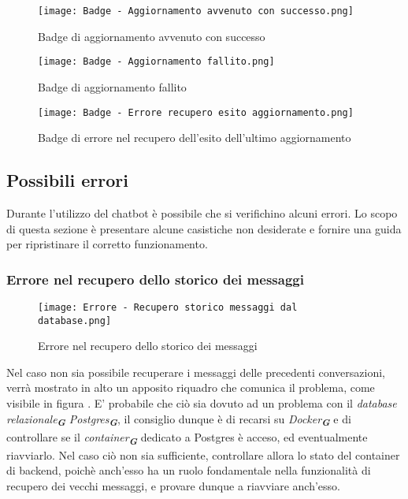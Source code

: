 \newpage

\begin{figure}[h]
    \centering
        \texttt{[image: Badge - Aggiornamento avvenuto con successo.png]}
        \caption{Badge di aggiornamento avvenuto con successo}
        \label{fig:Aggiornamento avvenuto con successo}        
\end{figure}

\begin{figure}[h]
    \centering
        \texttt{[image: Badge - Aggiornamento fallito.png]}
        \caption{Badge di aggiornamento fallito}
        \label{fig:Aggiornamento fallito}
\end{figure}

\begin{figure}[h]
    \centering
        \texttt{[image: Badge - Errore recupero esito aggiornamento.png]}
        \caption{Badge di errore nel recupero dell'esito dell'ultimo aggiornamento}
        \label{fig:Errore nel recupero dell'esito dell'ultimo aggiornamento}
\end{figure}



\newpage

\subsection{Possibili errori}
\label{subsec:possibili_errori}

Durante l'utilizzo del chatbot è possibile che si verifichino alcuni errori. Lo scopo di questa sezione è presentare alcune casistiche non desiderate e fornire una guida per ripristinare il corretto funzionamento.


\subsubsection{Errore nel recupero dello storico dei messaggi}

\begin{figure}[h]
    \centering
        \texttt{[image: Errore - Recupero storico messaggi dal database.png]}
        \caption{Errore nel recupero dello storico dei messaggi}
        \label{fig:Errore nel recupero dello storico dei messaggi}
\end{figure}

Nel caso non sia possibile recuperare i messaggi delle precedenti conversazioni, verrà mostrato in alto un apposito riquadro che comunica il problema, come visibile in figura . E' probabile che ciò sia dovuto ad un problema con il \emph{database relazionale}\textsubscript{\textbf{\textit{G}}} \emph{Postgres}\textsubscript{\textbf{\textit{G}}}, il consiglio dunque è di recarsi su \emph{Docker}\textsubscript{\textbf{\textit{G}}} e di controllare se il \emph{container}\textsubscript{\textbf{\textit{G}}} dedicato a Postgres è acceso, ed eventualmente riavviarlo. Nel caso ciò non sia sufficiente, controllare allora lo stato del container di backend, poichè anch'esso ha un ruolo fondamentale nella funzionalità di recupero dei vecchi messaggi, e provare dunque a riavviare anch'esso.


